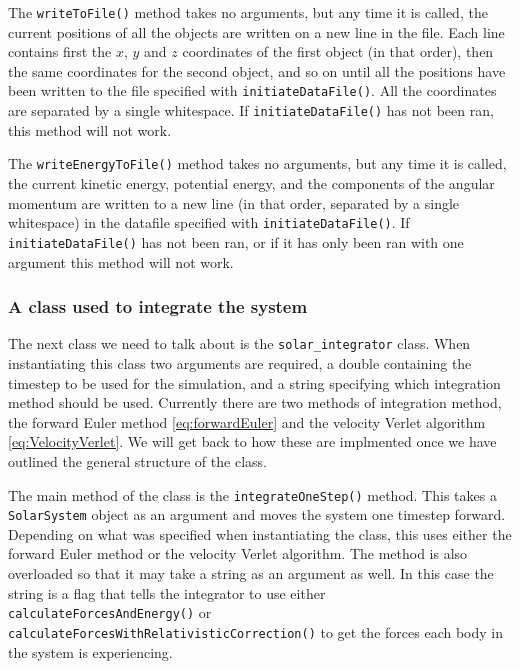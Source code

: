 \documentclass[reprint,english,notitlepage]{revtex4-1}  %
\begin{document}
\label{poi:write_to_file}
The \verb+writeToFile()+ method takes no arguments, but any time it is called, the current positions of all the objects are written on a new line in the file. Each line contains first the $x$, $y$ and $z$ coordinates of the first object (in that order), then the same coordinates for the second object, and so on until all the positions have been written to the file specified with \verb+initiateDataFile()+. All the coordinates are separated by a single whitespace. If \verb+initiateDataFile()+ has not been ran, this method will not work. \newline

\label{poi:write_energy_to_file}
The \verb+writeEnergyToFile()+ method takes no arguments, but any time it is called, the current kinetic energy, potential energy, and the components of the angular momentum are written to a new line (in that order, separated by a single whitespace) in the datafile specified with \verb+initiateDataFile()+. If \verb+initiateDataFile()+ has not been ran, or if it has only been ran with one argument this method will not work.


\subsubsection{A class used to integrate the system} \label{sec:III:a:3}

The next class we need to talk about is the \verb+solar_integrator+ class. When instantiating this class two arguments are required, a double containing the timestep to be used for the simulation, and a string specifying which integration method should be used. Currently there are two methods of integration method, the forward Euler method \eqref{eq:forwardEuler} and the velocity Verlet algorithm \eqref{eq:VelocityVerlet}. We will get back to how these are implmented once we have outlined the general structure of the class.

The main method of the class is the \verb+integrateOneStep()+ method. This takes a \verb+SolarSystem+ object as an argument and moves the system one timestep forward. Depending on what was specified when instantiating the class, this uses either the forward Euler method or the velocity Verlet algorithm. The method is also overloaded so that it may take a string as an argument as well. In this case the string is a flag that tells the integrator to use either \verb+calculateForcesAndEnergy()+ or \verb+calculateForcesWithRelativisticCorrection()+ to get the forces each body in the system is experiencing.
\end{document}
